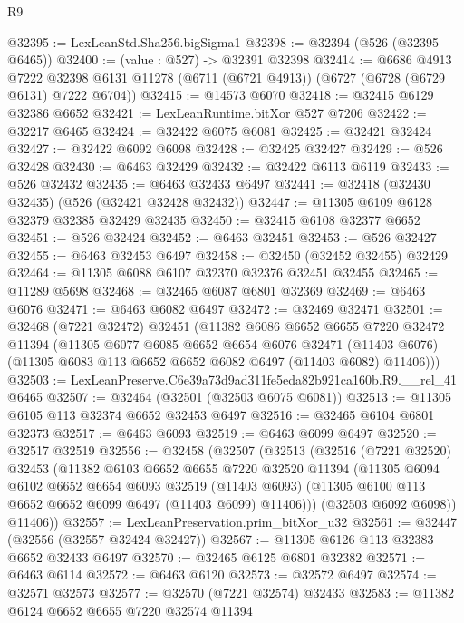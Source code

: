 \begin{lexlean}{R9}
\begin{coremodule}
@32395 := LexLeanStd.Sha256.bigSigma1
@32398 := @32394 (@526 (@32395 @6465))
@32400 := (value : @527) -> @32391 @32398
@32414 := @6686
    @4913
    @7222
    @32398
    @6131
    @11278
    (@6711 (@6721 @4913))
    (@6727 (@6728 (@6729 @6131) @7222 @6704))
@32415 := @14573 @6070
@32418 := @32415 @6129 @32386 @6652
@32421 := LexLeanRuntime.bitXor @527 @7206
@32422 := @32217 @6465
@32424 := @32422 @6075 @6081
@32425 := @32421 @32424
@32427 := @32422 @6092 @6098
@32428 := @32425 @32427
@32429 := @526 @32428
@32430 := @6463 @32429
@32432 := @32422 @6113 @6119
@32433 := @526 @32432
@32435 := @6463 @32433 @6497
@32441 := @32418 (@32430 @32435) (@526 (@32421 @32428 @32432))
@32447 := @11305 @6109 @6128 @32379 @32385 @32429 @32435
@32450 := @32415 @6108 @32377 @6652
@32451 := @526 @32424
@32452 := @6463 @32451
@32453 := @526 @32427
@32455 := @6463 @32453 @6497
@32458 := @32450 (@32452 @32455) @32429
@32464 := @11305 @6088 @6107 @32370 @32376 @32451 @32455
@32465 := @11289 @5698
@32468 := @32465 @6087 @6801 @32369
@32469 := @6463 @6076
@32471 := @6463 @6082 @6497
@32472 := @32469 @32471
@32501 := @32468
    (@7221 @32472)
    @32451
    (@11382
      @6086
      @6652
      @6655
      @7220
      @32472
      @11394
      (@11305
        @6077
        @6085
        @6652
        @6654
        @6076
        @32471
        (@11403 @6076)
        (@11305 @6083 @113 @6652 @6652 @6082 @6497 (@11403 @6082) @11406)))
@32503 := LexLeanPreserve.C6e39a73d9ad311fe5eda82b921ca160b.R9.__rel_41 @6465
@32507 := @32464 (@32501 (@32503 @6075 @6081))
@32513 := @11305 @6105 @113 @32374 @6652 @32453 @6497
@32516 := @32465 @6104 @6801 @32373
@32517 := @6463 @6093
@32519 := @6463 @6099 @6497
@32520 := @32517 @32519
@32556 := @32458
    (@32507
      (@32513
        (@32516
          (@7221 @32520)
          @32453
          (@11382
            @6103
            @6652
            @6655
            @7220
            @32520
            @11394
            (@11305
              @6094
              @6102
              @6652
              @6654
              @6093
              @32519
              (@11403 @6093)
              (@11305 @6100 @113 @6652 @6652 @6099 @6497 (@11403 @6099) @11406)))
          (@32503 @6092 @6098))
        @11406))
@32557 := LexLeanPreservation.prim_bitXor_u32
@32561 := @32447 (@32556 (@32557 @32424 @32427))
@32567 := @11305 @6126 @113 @32383 @6652 @32433 @6497
@32570 := @32465 @6125 @6801 @32382
@32571 := @6463 @6114
@32572 := @6463 @6120
@32573 := @32572 @6497
@32574 := @32571 @32573
@32577 := @32570 (@7221 @32574) @32433
@32583 := @11382 @6124 @6652 @6655 @7220 @32574 @11394

\end{coremodule}
\end{lexlean}
